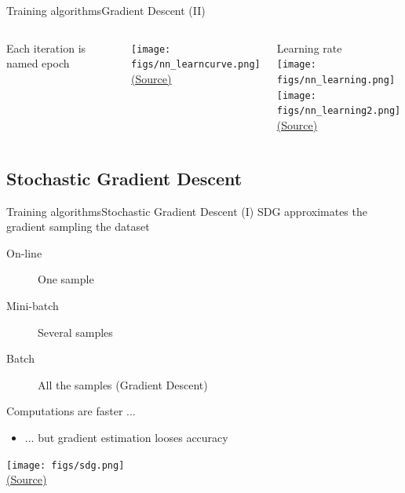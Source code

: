\documentclass[10pt,compress]{beamer} %
\begin{document}
\begin{frame}{Training algorithms}{Gradient Descent (II)}
    \begin{columns}
	Each iteration is named \alert{epoch}
	\begin{center}
	\texttt{[image: figs/nn\_learncurve.png]}\\
	\scriptsize \href{http://sujitpal.blogspot.com.es/2014/07/handwritten-digit-recognition-with.html}{(Source)}
	\end{center}

	\vspace{-0.5cm}
	\begin{center}
        Learning rate\\
	\texttt{[image: figs/nn\_learning.png]}\\
	\texttt{[image: figs/nn\_learning2.png]}\\
	\scriptsize \href{http://www.turingfinance.com/misconceptions-about-neural-networks/}{(Source)}
	\end{center}
     \end{columns}
\end{frame}

\subsection{Stochastic Gradient Descent}
\begin{frame}{Training algorithms}{Stochastic Gradient Descent (I)}
	SDG approximates the gradient sampling the dataset
		\begin{description}
		\item[On-line] One sample
		\item[Mini-batch] Several samples
		\item[Batch] All the samples (Gradient Descent)
		\end{description}
    	Computations are faster ...
	\begin{itemize}
		\item ... but gradient estimation looses accuracy
	\end{itemize}

	\centering
	\texttt{[image: figs/sdg.png]}\\
	\scriptsize \href{https://wikidocs.net/3413}{(Source)}
\end{frame}
\end{document}
